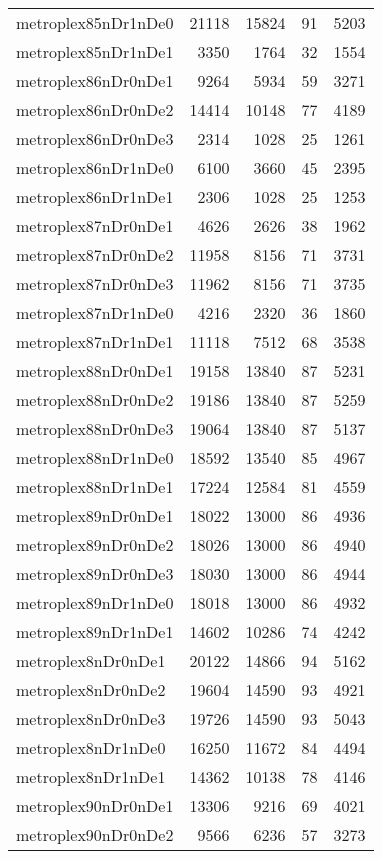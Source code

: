 \begin{longtable}{lrrrr}
metroplex85nDr1nDe0 & 21118 & 15824 & 91 & 5203 \\
metroplex85nDr1nDe1 & 3350 & 1764 & 32 & 1554 \\
metroplex86nDr0nDe1 & 9264 & 5934 & 59 & 3271 \\
metroplex86nDr0nDe2 & 14414 & 10148 & 77 & 4189 \\
metroplex86nDr0nDe3 & 2314 & 1028 & 25 & 1261 \\
metroplex86nDr1nDe0 & 6100 & 3660 & 45 & 2395 \\
metroplex86nDr1nDe1 & 2306 & 1028 & 25 & 1253 \\
metroplex87nDr0nDe1 & 4626 & 2626 & 38 & 1962 \\
metroplex87nDr0nDe2 & 11958 & 8156 & 71 & 3731 \\
metroplex87nDr0nDe3 & 11962 & 8156 & 71 & 3735 \\
metroplex87nDr1nDe0 & 4216 & 2320 & 36 & 1860 \\
metroplex87nDr1nDe1 & 11118 & 7512 & 68 & 3538 \\
metroplex88nDr0nDe1 & 19158 & 13840 & 87 & 5231 \\
metroplex88nDr0nDe2 & 19186 & 13840 & 87 & 5259 \\
metroplex88nDr0nDe3 & 19064 & 13840 & 87 & 5137 \\
metroplex88nDr1nDe0 & 18592 & 13540 & 85 & 4967 \\
metroplex88nDr1nDe1 & 17224 & 12584 & 81 & 4559 \\
metroplex89nDr0nDe1 & 18022 & 13000 & 86 & 4936 \\
metroplex89nDr0nDe2 & 18026 & 13000 & 86 & 4940 \\
metroplex89nDr0nDe3 & 18030 & 13000 & 86 & 4944 \\
metroplex89nDr1nDe0 & 18018 & 13000 & 86 & 4932 \\
metroplex89nDr1nDe1 & 14602 & 10286 & 74 & 4242 \\
metroplex8nDr0nDe1 & 20122 & 14866 & 94 & 5162 \\
metroplex8nDr0nDe2 & 19604 & 14590 & 93 & 4921 \\
metroplex8nDr0nDe3 & 19726 & 14590 & 93 & 5043 \\
metroplex8nDr1nDe0 & 16250 & 11672 & 84 & 4494 \\
metroplex8nDr1nDe1 & 14362 & 10138 & 78 & 4146 \\
metroplex90nDr0nDe1 & 13306 & 9216 & 69 & 4021 \\
metroplex90nDr0nDe2 & 9566 & 6236 & 57 & 3273 \\

\end{longtable}
